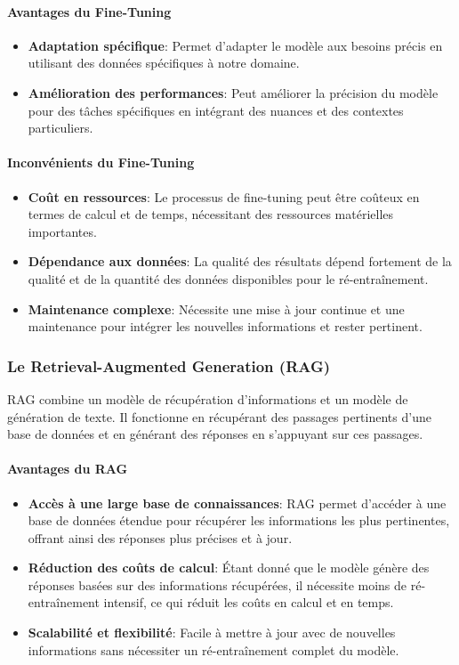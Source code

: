 \documentclass[a4paper, 11pt, openany]{report}
\begin{document}
\paragraph{Avantages du Fine-Tuning}
\begin{itemize}
    \item \textbf{Adaptation spécifique}: Permet d’adapter le modèle aux besoins précis en utilisant des données spécifiques à notre domaine.
    \item \textbf{Amélioration des performances}: Peut améliorer la précision du modèle pour des tâches spécifiques en intégrant des nuances et des contextes particuliers.
\end{itemize}

\paragraph{Inconvénients du Fine-Tuning}
\begin{itemize}
    \item \textbf{Coût en ressources}: Le processus de fine-tuning peut être coûteux en termes de calcul et de temps, nécessitant des ressources matérielles importantes.
    \item \textbf{Dépendance aux données}: La qualité des résultats dépend fortement de la qualité et de la quantité des données disponibles pour le ré-entraînement.
    \item \textbf{Maintenance complexe}: Nécessite une mise à jour continue et une maintenance pour intégrer les nouvelles informations et rester pertinent.
\end{itemize}

\subsubsection{Le Retrieval-Augmented Generation (RAG)}
RAG combine un modèle de récupération d'informations et un modèle de génération de texte. Il fonctionne en récupérant des passages pertinents d'une base de données et en générant des réponses en s'appuyant sur ces passages.

\paragraph{Avantages du RAG}
\begin{itemize}
    \item \textbf{Accès à une large base de connaissances}: RAG permet d'accéder à une base de données étendue pour récupérer les informations les plus pertinentes, offrant ainsi des réponses plus précises et à jour.
    \item \textbf{Réduction des coûts de calcul}: Étant donné que le modèle génère des réponses basées sur des informations récupérées, il nécessite moins de ré-entraînement intensif, ce qui réduit les coûts en calcul et en temps.
    \item \textbf{Scalabilité et flexibilité}: Facile à mettre à jour avec de nouvelles informations sans nécessiter un ré-entraînement complet du modèle.
\end{itemize}
\end{document}
